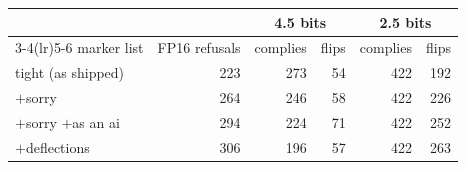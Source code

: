 \begin{tabular}{lrrrrr}
\toprule
& & \multicolumn{2}{c}{4.5 bits} & \multicolumn{2}{c}{2.5 bits} \\
\cmidrule(lr){3-4}\cmidrule(lr){5-6}
marker list & FP16 refusals & complies & flips & complies & flips \\
\midrule
tight (as shipped) & 223 & 273 & 54 & 422 & 192 \\
$+$sorry & 264 & 246 & 58 & 422 & 226 \\
$+$sorry $+$as an ai & 294 & 224 & 71 & 422 & 252 \\
$+$deflections & 306 & 196 & 57 & 422 & 263 \\
\bottomrule
\end{tabular}
